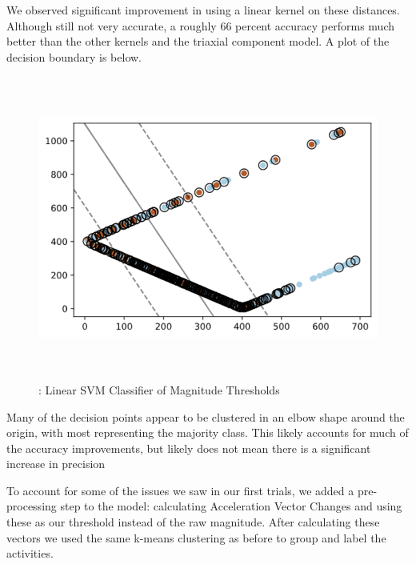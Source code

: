 \documentclass{llncs}
\begin{document}
    We observed significant improvement in using a linear kernel on these distances. Although still not very accurate, a roughly 66 percent accuracy performs much better than the other kernels and the triaxial component model. A plot of the decision boundary is below.
    
\begin{figure}
	\centering
	\includegraphics[width=12cm, height=10cm]{images/Classification/linear_classifier_boundary.png} 
	\caption{: Linear SVM Classifier of Magnitude Thresholds}
	\label{Figure 3: Decision Boundary of Linear Kernel SVM with Magnitude Thresholds}
\end{figure}     

    Many of the decision points appear to be clustered in an elbow shape around the origin, with most representing the majority class. This likely accounts for much of the accuracy improvements, but likely does not mean there is a significant increase in precision
    
	To account for some of the issues we saw in our first trials, we added a pre-processing step to the model: calculating Acceleration Vector Changes and using these as our threshold instead of the raw magnitude. After calculating these vectors we used the same k-means clustering as before to group and label the activities.
	
\end{document}
